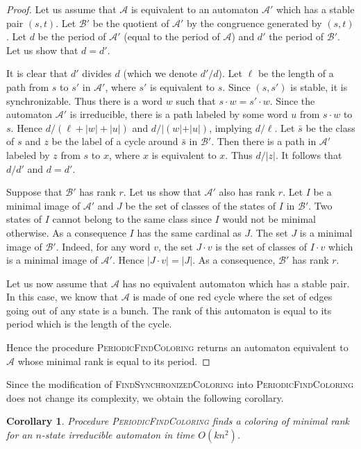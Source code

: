 \documentclass[11pt,a4paper]{article}
\newtheorem{corollary}[theorem]{Corollary}
\def\A{\mathcal{A}}
\def\B{\mathcal{B}}
\begin{document}
\begin{proof}


  Let us assume that $\A$ is equivalent to an automaton $\A'$ which
  has a stable pair $(s,t)$. Let $\B'$ be the quotient of $\A'$ by the
  congruence generated by $(s,t)$. Let $d$ be the period of $\A'$
  (equal to the period of $\A$) and $d'$ the period of $\B'$. 
  Let us show that $d = d'$.

It is clear that $d'$ divides $d$ (which we denote $d' / d$). Let
$\ell$ be the length of a path from $s$ to $s'$ in $\A'$, where $s'$
is equivalent to $s$. Since $(s,s')$ is stable, it is
synchronizable. Thus there is a word $w$ such that $s \cdot w = s'
\cdot w$. Since the automaton $\A'$ is irreducible, there is a path
labeled by some word $u$ from $s \cdot w$ to $s$. Hence $d / (\ell +
|w| + |u|)$ and $d / |(w| + |u|)$, implying $d / \ell$.  Let $\bar{s}$
be the class of $s$ and $z$ be the label of a cycle around $\bar{s}$
in $\B'$. Then there is a path in $\A'$ labeled by $z$ from $s$ to
$x$, where $x$ is equivalent to $x$. Thus $d / |z|$. It follows that
$d / d'$ and $d = d'$.

 Suppose that $\B'$ has rank $r$.  Let us show that $\A'$ also has
 rank $r$. Let $I$ be a minimal image of $\A'$ and $J$ be the set of
 classes of the states of $I$ in $\B'$. Two states of $I$ cannot
 belong to the same class since $I$ would not be minimal otherwise.
 As a consequence $I$ has the same cardinal as $J$. The set $J$ is a
 minimal image of $\B'$. Indeed, for any word $v$, the set $J \cdot v$
 is the set of classes of $I \cdot v$ which is a minimal image of
 $\A'$. Hence $|J \cdot v| = |J|$. As a consequence, $\B'$ has rank $r$.

  Let us now assume that $\A$ has no equivalent automaton which has a
  stable pair. In this case, we know that $\A$ is made of one red
  cycle where the set of edges going out of any state is a bunch. The
  rank of this automaton is equal to its period which is the
  length of the cycle. 

  Hence the procedure \textsc{PeriodicFindColoring} returns an
  automaton equivalent to $\A$ whose minimal rank is equal to its
  period.
\end{proof}

Since the modification of \textsc{FindSynchronizedColoring} into
\textsc{PeriodicFindColoring} does not change its complexity, we
obtain the following corollary.
\begin{corollary}
Procedure \textsc{PeriodicFindColoring} finds a coloring of minimal rank
for an $n$-state irreducible automaton in time $O(kn^2)$.
\end{corollary}
\end{document}
